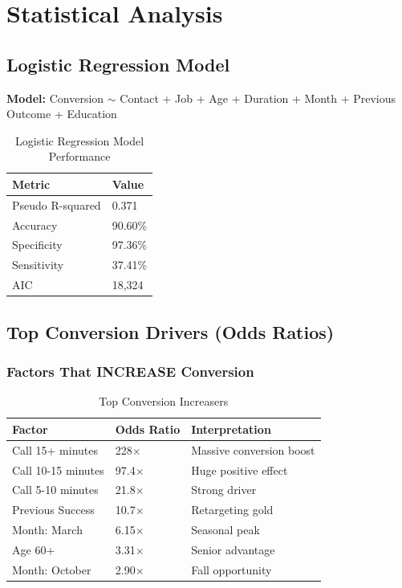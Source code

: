 \documentclass[11pt,a4paper]{article}
\begin{document}
\section{Statistical Analysis}

\subsection{Logistic Regression Model}

\textbf{Model:} Conversion $\sim$ Contact + Job + Age + Duration + Month + Previous Outcome + Education

\begin{table}[H]
\centering
\begin{tabular}{p{4cm} p{3cm}}
\toprule
\rowcolor{primary!10}
\textbf{Metric} & \textbf{Value} \\
\midrule
Pseudo R-squared & 0.371 \\
Accuracy & 90.60\% \\
Specificity & 97.36\% \\
Sensitivity & 37.41\% \\
AIC & 18,324 \\
\bottomrule
\end{tabular}
\caption{Logistic Regression Model Performance}
\end{table}

\subsection{Top Conversion Drivers (Odds Ratios)}

\subsubsection{Factors That INCREASE Conversion}

\begin{table}[H]
\centering
\begin{tabular}{p{4.5cm} p{2.5cm} p{4.5cm}}
\toprule
\rowcolor{primary!10}
\textbf{Factor} & \textbf{Odds Ratio} & \textbf{Interpretation} \\
\midrule
\rowcolor{conversiongreen!15}
Call 15+ minutes & 228$\times$ & Massive conversion boost \\
Call 10-15 minutes & 97.4$\times$ & Huge positive effect \\
Call 5-10 minutes & 21.8$\times$ & Strong driver \\
Previous Success & 10.7$\times$ & Retargeting gold \\
Month: March & 6.15$\times$ & Seasonal peak \\
Age 60+ & 3.31$\times$ & Senior advantage \\
Month: October & 2.90$\times$ & Fall opportunity \\
\bottomrule
\end{tabular}
\caption{Top Conversion Increasers}
\end{table}
\end{document}
